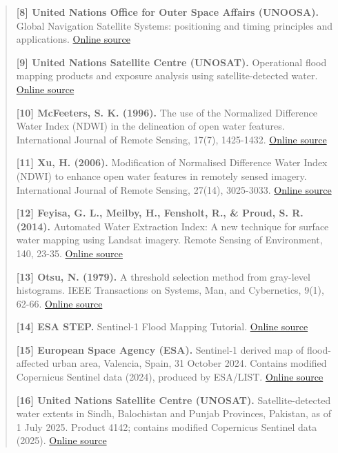 \documentclass[11pt,a4paper]{article}
\begin{document}
\begin{quote}
\textbf{{[}8{]} United Nations Office for Outer Space Affairs (UNOOSA).} Global Navigation Satellite Systems: positioning and timing principles and applications. \href{https://www.unoosa.org/oosa/en/ourwork/psa/gnss/gnss.html}{Online source}

\textbf{{[}9{]} United Nations Satellite Centre (UNOSAT).} Operational flood mapping products and exposure analysis using satellite-detected water. \href{https://unosat.org/}{Online source}

\textbf{{[}10{]} McFeeters, S. K. (1996).} The use of the Normalized Difference Water Index (NDWI) in the delineation of open water features. International Journal of Remote Sensing, 17(7), 1425-1432. \href{https://doi.org/10.1080/01431169608948714}{Online source}

\textbf{{[}11{]} Xu, H. (2006).} Modification of Normalised Difference Water Index (NDWI) to enhance open water features in remotely sensed imagery. International Journal of Remote Sensing, 27(14), 3025-3033. \href{https://doi.org/10.1080/01431160600589179}{Online source}

\textbf{{[}12{]} Feyisa, G. L., Meilby, H., Fensholt, R., \& Proud, S. R. (2014).} Automated Water Extraction Index: A new technique for surface water mapping using Landsat imagery. Remote Sensing of Environment, 140, 23-35. \href{https://doi.org/10.1016/j.rse.2013.08.029}{Online source}

\textbf{{[}13{]} Otsu, N. (1979).} A threshold selection method from gray-level histograms. IEEE Transactions on Systems, Man, and Cybernetics, 9(1), 62-66. \href{https://doi.org/10.1109/TSMC.1979.4310076}{Online source}

\textbf{{[}14{]} ESA STEP.} Sentinel-1 Flood Mapping Tutorial. \href{https://step.esa.int/docs/tutorials/tutorial_s1floodmapping.pdf}{Online source}

\textbf{{[}15{]} European Space Agency (ESA).} Sentinel-1 derived map of flood-affected urban area, Valencia, Spain, 31 October 2024. Contains modified Copernicus Sentinel data (2024), produced by ESA/LIST. \href{https://www.esa.int/ESA_Multimedia/Images/2024/11/Sentinel-1_derived_map_of_flood_affected_urban_area_-_Valencia_Spain}{Online source}

\textbf{{[}16{]} United Nations Satellite Centre (UNOSAT).} Satellite-detected water extents in Sindh, Balochistan and Punjab Provinces, Pakistan, as of 1 July 2025. Product 4142; contains modified Copernicus Sentinel data (2025). \href{https://unosat.org/products/4142}{Online source}
\end{quote}
\end{document}
